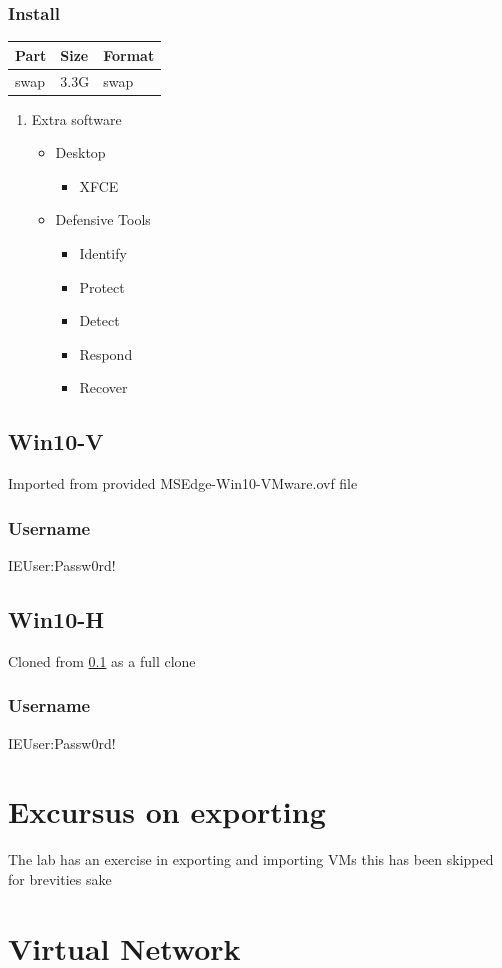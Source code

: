 \documentclass[11pt]{article}
\begin{document}
\subsubsection{Install}
\label{sec:orgb23c693}
\begin{center}
\begin{tabular}{lll}
Part & Size & Format\\[0pt]
\hline
swap & 3.3G & swap\\[0pt]
\end{tabular}
\end{center}
\begin{enumerate}
\item Extra software
\label{sec:org0ca87ac}
\begin{itemize}
\item Desktop
\begin{itemize}
\item XFCE
\end{itemize}
\item Defensive Tools
\begin{itemize}
\item Identify
\item Protect
\item Detect
\item Respond
\item Recover
\end{itemize}
\end{itemize}
\end{enumerate}
\subsection{Win10-V}
\label{sec:org98b50f6}
Imported from provided MSEdge-Win10-VMware.ovf file
\subsubsection{Username}
\label{sec:org11e0769}
IEUser:Passw0rd!
\subsection{Win10-H}
\label{sec:orgb8481a0}
Cloned from \ref{sec:org98b50f6} as a full clone
\subsubsection{Username}
\label{sec:orgcbdcb48}
IEUser:Passw0rd!

\section{Excursus on exporting}
\label{sec:org3d56cae}
The lab has an exercise in exporting and importing VMs this has been skipped for brevities sake
\section{Virtual Network}
\label{sec:org4cacf31}
\end{document}
